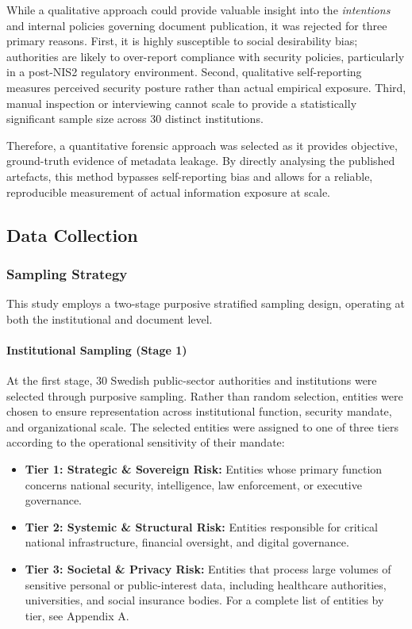 \documentclass[conference]{IEEEtran}
\begin{document}
While a qualitative approach could provide valuable insight into the \textit{intentions} and internal policies governing document publication, it was rejected for three primary reasons. First, it is highly susceptible to social desirability bias; authorities are likely to over-report compliance with security policies, particularly in a post-NIS2 regulatory environment. Second, qualitative self-reporting measures perceived security posture rather than actual empirical exposure. Third, manual inspection or interviewing cannot scale to provide a statistically significant sample size across 30 distinct institutions. 

Therefore, a quantitative forensic approach was selected as it provides objective, ground-truth evidence of metadata leakage. By directly analysing the published artefacts, this method bypasses self-reporting bias and allows for a reliable, reproducible measurement of actual information exposure at scale.

\subsection{Data Collection}

\subsubsection{Sampling Strategy}
This study employs a two-stage purposive stratified sampling design, operating at both the institutional and document level.

\paragraph{Institutional Sampling (Stage 1)}
At the first stage, 30 Swedish public-sector authorities and institutions were selected through purposive sampling. Rather than random selection, entities were chosen to ensure representation across institutional function, security mandate, and organizational scale. The selected entities were assigned to one of three tiers according to the operational sensitivity of their mandate:

\begin{itemize}
    \item \textbf{Tier 1: Strategic \& Sovereign Risk:} Entities whose primary function concerns national security, intelligence, law enforcement, or executive governance. 
    \item \textbf{Tier 2: Systemic \& Structural Risk:} Entities responsible for critical national infrastructure, financial oversight, and digital governance. 
    \item \textbf{Tier 3: Societal \& Privacy Risk:} Entities that process large volumes of sensitive personal or public-interest data, including healthcare authorities, universities, and social insurance bodies. For a complete list of entities by tier, see Appendix A.
\end{itemize}
\end{document}
